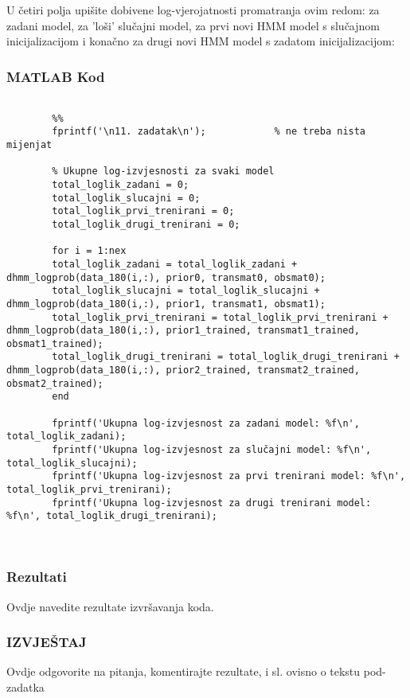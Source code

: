 \documentclass[12pt]{article}
\begin{document}
	U četiri polja upišite dobivene log-vjerojatnosti promatranja ovim redom: za zadani model, za 'loši' slučajni model, za prvi novi HMM model s slučajnom inicijalizacijom i konačno za drugi novi HMM model s zadatom inicijalizacijom:
	
	\subsubsection*{MATLAB Kod}
	\begin{lstlisting}
		
		%%
		fprintf('\n11. zadatak\n');            % ne treba nista mijenjat
		
		% Ukupne log-izvjesnosti za svaki model
		total_loglik_zadani = 0;
		total_loglik_slucajni = 0;
		total_loglik_prvi_trenirani = 0;
		total_loglik_drugi_trenirani = 0;
		
		for i = 1:nex
		total_loglik_zadani = total_loglik_zadani + dhmm_logprob(data_180(i,:), prior0, transmat0, obsmat0);
		total_loglik_slucajni = total_loglik_slucajni + dhmm_logprob(data_180(i,:), prior1, transmat1, obsmat1);
		total_loglik_prvi_trenirani = total_loglik_prvi_trenirani + dhmm_logprob(data_180(i,:), prior1_trained, transmat1_trained, obsmat1_trained);
		total_loglik_drugi_trenirani = total_loglik_drugi_trenirani + dhmm_logprob(data_180(i,:), prior2_trained, transmat2_trained, obsmat2_trained);
		end
		
		fprintf('Ukupna log-izvjesnost za zadani model: %f\n', total_loglik_zadani);
		fprintf('Ukupna log-izvjesnost za slučajni model: %f\n', total_loglik_slucajni);
		fprintf('Ukupna log-izvjesnost za prvi trenirani model: %f\n', total_loglik_prvi_trenirani);
		fprintf('Ukupna log-izvjesnost za drugi trenirani model: %f\n', total_loglik_drugi_trenirani);
		
		
	\end{lstlisting}
	
	\subsubsection*{Rezultati}
	Ovdje navedite rezultate izvršavanja koda.
	
	\subsubsection*{IZVJEŠTAJ}
	Ovdje odgovorite na pitanja, komentirajte rezultate, i sl. ovisno o tekstu pod-zadatka
	
	

	
\end{document}
